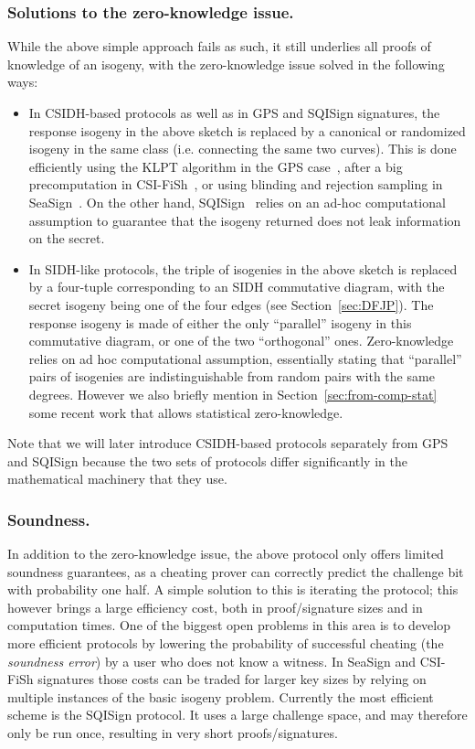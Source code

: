 \documentclass{llncs}
\begin{document}
\subsubsection{Solutions to the zero-knowledge issue.}
While the above simple approach fails  as such, it still underlies all proofs of knowledge of an isogeny, with the zero-knowledge issue solved in the following ways:
\begin{itemize}
    \item In CSIDH-based protocols as well as in GPS and SQISign signatures, the response isogeny in the above sketch is replaced by a canonical or randomized isogeny in the same class (i.e. connecting the same two curves). This is done efficiently using the KLPT algorithm in the GPS case~\cite{GPS20}, after a big precomputation in CSI-FiSh~\cite{CSI-FiSh}, or using blinding and rejection sampling in SeaSign~\cite{SeaSign}. On the other hand, SQISign~\cite{DFKLPW20} relies on an ad-hoc computational assumption to guarantee that the isogeny returned does not leak information on the secret.
%
    \item In SIDH-like protocols, the triple of isogenies in the above sketch is replaced by a four-tuple corresponding to an SIDH commutative diagram, with the secret isogeny being one of the four edges (see Section~\ref{sec:DFJP}).  The response isogeny is made of either the only ``parallel'' isogeny in this commutative diagram, or one of the two ``orthogonal'' ones. %
    Zero-knowledge relies on  ad hoc computational assumption, essentially stating that ``parallel'' pairs of isogenies are indistinguishable from random pairs with the same degrees.
    However we also briefly mention in Section~\ref{sec:from-comp-stat} some recent work that allows statistical zero-knowledge.
\end{itemize}

    Note that we will later introduce CSIDH-based protocols separately from GPS and SQISign because the two sets of protocols differ significantly in the mathematical machinery that they use.

\subsubsection{Soundness.} In addition to the zero-knowledge issue, the above protocol  only offers limited soundness guarantees, as a cheating prover can correctly predict the challenge bit with probability one half. 
%
A simple solution to this is iterating the protocol; this however brings a large efficiency cost, both in proof/signature sizes and in computation times.
One of the biggest open problems in this area is to develop more efficient protocols by lowering the probability of successful cheating (the \emph{soundness error}) by a user who does not know a witness.
%
In SeaSign and CSI-FiSh signatures those costs can be traded for larger key sizes by relying on multiple instances of the basic isogeny problem.
%
Currently the most efficient scheme is the SQISign protocol. It uses a large challenge space, and may therefore only be run once, resulting in very short proofs/signatures.
\end{document}
